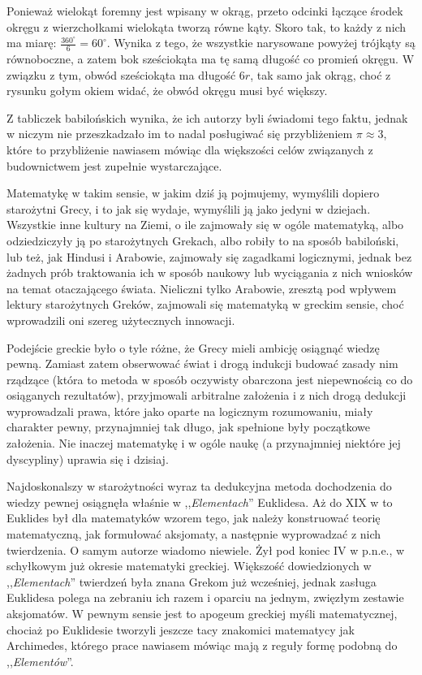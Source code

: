 \documentclass[12pt, a4paper]{article}
\begin{document}
Ponieważ wielokąt foremny jest wpisany w okrąg, przeto odcinki łączące środek
okręgu z wierzchołkami wielokąta tworzą równe kąty. Skoro tak, to każdy z nich
ma miarę: $\frac{360^\circ}{6} = 60^\circ$. Wynika z tego, że wszystkie
narysowane powyżej trójkąty są równoboczne, a zatem bok sześciokąta ma tę samą
długość co promień okręgu. W związku z tym, obwód sześciokąta ma długość $6r$,
tak samo jak okrąg, choć z rysunku gołym okiem widać, że obwód okręgu musi być
większy.

Z tabliczek babilońskich wynika, że ich autorzy byli świadomi tego faktu, jednak
w niczym nie przeszkadzało im to nadal posługiwać się przybliżeniem $\pi
\approx 3$, które to przybliżenie nawiasem mówiąc dla większości celów
związanych z budownictwem jest zupełnie wystarczające.

Matematykę w takim sensie, w jakim dziś ją pojmujemy, wymyślili dopiero
starożytni Grecy, i to jak się wydaje, wymyślili ją jako jedyni w dziejach.
Wszystkie inne kultury na Ziemi, o ile zajmowały się w ogóle matematyką, albo
odziedziczyły ją po starożytnych Grekach, albo robiły to na sposób babiloński,
lub też, jak Hindusi i Arabowie, zajmowały się zagadkami logicznymi, jednak bez
żadnych prób traktowania ich w sposób naukowy lub wyciągania z nich wniosków na
temat otaczającego świata. Nieliczni tylko Arabowie, zresztą pod wpływem lektury
starożytnych Greków, zajmowali się matematyką w greckim sensie, choć wprowadzili
oni szereg użytecznych innowacji.

Podejście greckie było o tyle różne, że Grecy mieli ambicję osiągnąć wiedzę
pewną. Zamiast zatem obserwować świat i drogą indukcji budować zasady
nim rządzące (która to metoda w sposób oczywisty obarczona jest niepewnością
co do osiąganych rezultatów), przyjmowali arbitralne założenia i z nich drogą
dedukcji wyprowadzali prawa, które jako oparte na logicznym rozumowaniu, miały
charakter pewny, przynajmniej tak długo, jak spełnione były początkowe
założenia. Nie inaczej matematykę i w ogóle naukę (a przynajmniej niektóre jej
dyscypliny) uprawia się i dzisiaj.

Najdoskonalszy w starożytności wyraz ta dedukcyjna metoda dochodzenia do wiedzy
pewnej osiągnęła właśnie w ,,\emph{Elementach}'' Euklidesa. Aż do XIX w to
Euklides był dla matematyków wzorem tego, jak należy konstruować teorię
matematyczną, jak formułować aksjomaty, a następnie wyprowadzać z nich
twierdzenia. O samym autorze wiadomo niewiele. Żył pod koniec IV w p.n.e.,
w schyłkowym już okresie matematyki greckiej. Większość dowiedzionych w
,,\emph{Elementach}'' twierdzeń była znana Grekom już wcześniej, jednak zasługa
Euklidesa polega na zebraniu ich razem i oparciu na jednym, zwięzłym zestawie
aksjomatów. W pewnym sensie jest to apogeum greckiej myśli matematycznej,
chociaż po Euklidesie tworzyli jeszcze tacy znakomici matematycy jak Archimedes,
którego prace nawiasem mówiąc mają z reguły formę podobną do ,,\emph{Elementów}''.
\end{document}
